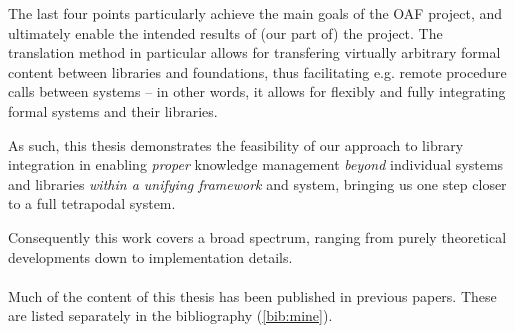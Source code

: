 The last four points particularly achieve the main goals of the OAF project, and ultimately enable the intended results of (our part of) the \ODK project. The translation method in particular allows for transfering virtually arbitrary formal content between libraries and foundations, thus facilitating e.g. remote procedure calls between systems -- in other words, it allows for flexibly and fully integrating formal systems and their libraries.

As such, this thesis demonstrates the feasibility of our approach to library integration in enabling \emph{proper} knowledge management \emph{beyond} individual systems and libraries \emph{within a unifying framework} and system, bringing us one step closer to a full tetrapodal system.
 
 Consequently this work covers a broad spectrum, ranging from purely theoretical developments down to implementation details. 

\paragraph{} Much of the content of this thesis has been published in previous papers. These are listed separately in the bibliography (\autoref{bib:mine}).